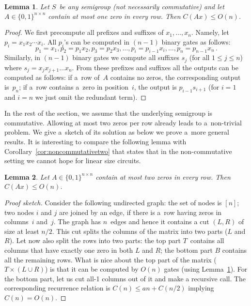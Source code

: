\documentclass[11pt,letterpaper]{article}
\newtheorem{lemma}{Lemma}
\begin{document}
\begin{lemma}\label{lemma:easy}
Let $S$~be {\em any} semigroup (not necessarily commutative) and let $A \in \{0,1\}^{n \times n}$ contain at most one zero in every row. Then $C(Ax) \le O(n)$.
\end{lemma}
\begin{proof}
We first precompute all prefixes and suffixes of $x_1, \dotsc, x_n$. Namely, let $p_i=x_1x_2\dotsb x_i$. All $p_i$'s can be computed in $(n-1)$ binary gates as follows:
\[p_1=x_1, p_2=p_1x_2, p_3=p_2x_3, \dotsc, p_i=p_{i-1}x_i, \dotsc, p_n=p_{n-1}x_n \, .\]
Similarly, in $(n-1)$ binary gates we compute all suffixes $s_j$
(for all $1 \le j \le n$) where $s_j=x_jx_{j+1}\dotsc x_n$. From
these prefixes and suffixes all the outputs can be computed as
follows: if a~row of~$A$ contains no zeros, the corresponding
output is~$p_n$; if a~row contains a~zero in position~$i$, the
output is $p_{i-1}s_{i+1}$ (for $i=1$ and $i=n$ we just omit
the redundant term).
\end{proof}

In the rest of the section, we assume that the underlying semigroup is commutative.
Allowing at most two zeros per row already leads to a~non-trivial
problem. We give a~sketch of its solution as
below we prove a~more general results.
It is interesting to compare the following lemma
with Corollary~\ref{cor:noncommutativetwo} that states that in
the non-commutative setting we cannot hope for linear size
circuits.

\begin{lemma}
Let $A \in \{0,1\}^{n \times n}$ contain at most two zeros in every row. Then $C(Ax) \le O(n)$.
\end{lemma}
\begin{proof}[Proof sketch]
Consider the following undirected graph: the set of nodes is $[n]$; two nodes $i$ and $j$ are joined by an edge, if there is a~row having zeros in columns~$i$ and~$j$. The graph has $n$~edges and hence it contains a cut $(L,R)$ of size at least $n/2$. This cut splits the columns of the matrix into two parts ($L$ and $R$). Let now also split the rows into two parts: the top part $T$~contains all columns that have exactly one zero in both $L$ and $R$; the bottom part $B$ contains all the remaining rows. What is nice about the top part of the matrix ($T \times (L \cup R)$) is that it can be computed by $O(n)$ gates (using Lemma~\ref{lemma:easy}). For the bottom part, let us cut all-1 columns out of it and make a recursive call. The corresponding recurrence relation is $C(n) \le an + C(n/2)$ implying $C(n)=O(n)$.
\end{proof}
\end{document}
